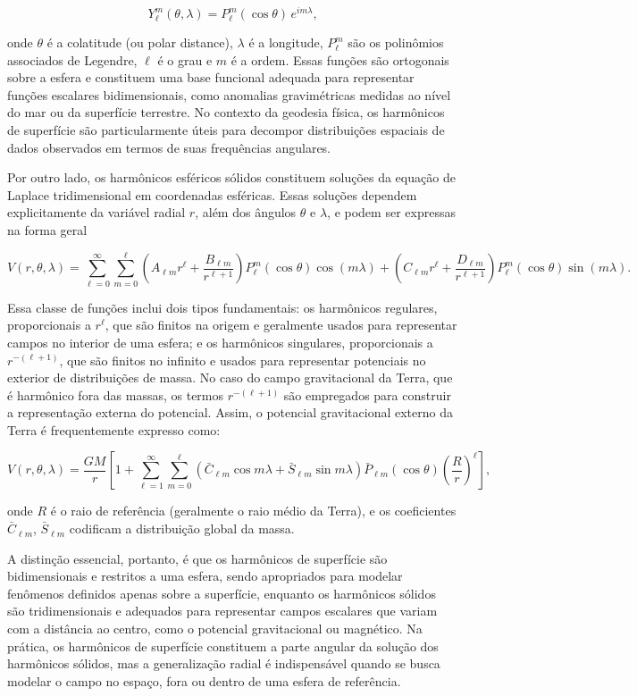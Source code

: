 \[
Y_\ell^m(\theta, \lambda) = P_\ell^m(\cos\theta) \, e^{im\lambda} \text{,}
\]

onde \( \theta \) é a colatitude (ou polar distance), \( \lambda \) é a longitude, \( P_\ell^m \) são os polinômios associados de Legendre, \( \ell \) é o grau e \( m \) é a ordem. Essas funções são ortogonais sobre a esfera e constituem uma base funcional adequada para representar funções escalares bidimensionais, como anomalias gravimétricas medidas ao nível do mar ou da superfície terrestre. No contexto da geodesia física, os harmônicos de superfície são particularmente úteis para decompor distribuições espaciais de dados observados em termos de suas frequências angulares.

Por outro lado, os harmônicos esféricos sólidos constituem soluções da equação de Laplace tridimensional em coordenadas esféricas. Essas soluções dependem explicitamente da variável radial \( r \), além dos ângulos \( \theta \) e \( \lambda \), e podem ser expressas na forma geral

\[
V(r, \theta, \lambda) = \sum_{\ell=0}^\infty \sum_{m=0}^\ell \left( A_{\ell m} r^\ell + \frac{B_{\ell m}}{r^{\ell+1}} \right) P_\ell^m(\cos\theta) \cos(m\lambda) + \left( C_{\ell m} r^\ell + \frac{D_{\ell m}}{r^{\ell+1}} \right) P_\ell^m(\cos\theta) \sin(m\lambda) \text{.}
\]

Essa classe de funções inclui dois tipos fundamentais: os harmônicos regulares, proporcionais a \( r^\ell \), que são finitos na origem e geralmente usados para representar campos no interior de uma esfera; e os harmônicos singulares, proporcionais a \( r^{-(\ell+1)} \), que são finitos no infinito e usados para representar potenciais no exterior de distribuições de massa. No caso do campo gravitacional da Terra, que é harmônico fora das massas, os termos \( r^{-(\ell+1)} \) são empregados para construir a representação externa do potencial. Assim, o potencial gravitacional externo da Terra é frequentemente expresso como:

\[
V(r, \theta, \lambda) = \frac{GM}{r} \left[ 1 + \sum_{\ell=1}^\infty \sum_{m=0}^\ell \left( \bar{C}_{\ell m} \cos m\lambda + \bar{S}_{\ell m} \sin m\lambda \right) \bar{P}_{\ell m}(\cos\theta) \left( \frac{R}{r} \right)^\ell \right] \text{,}
\]

onde \( R \) é o raio de referência (geralmente o raio médio da Terra), e os coeficientes \( \bar{C}_{\ell m} \), \( \bar{S}_{\ell m} \) codificam a distribuição global da massa.

A distinção essencial, portanto, é que os harmônicos de superfície são bidimensionais e restritos a uma esfera, sendo apropriados para modelar fenômenos definidos apenas sobre a superfície, enquanto os harmônicos sólidos são tridimensionais e adequados para representar campos escalares que variam com a distância ao centro, como o potencial gravitacional ou magnético. Na prática, os harmônicos de superfície constituem a parte angular da solução dos harmônicos sólidos, mas a generalização radial é indispensável quando se busca modelar o campo no espaço, fora ou dentro de uma esfera de referência.

